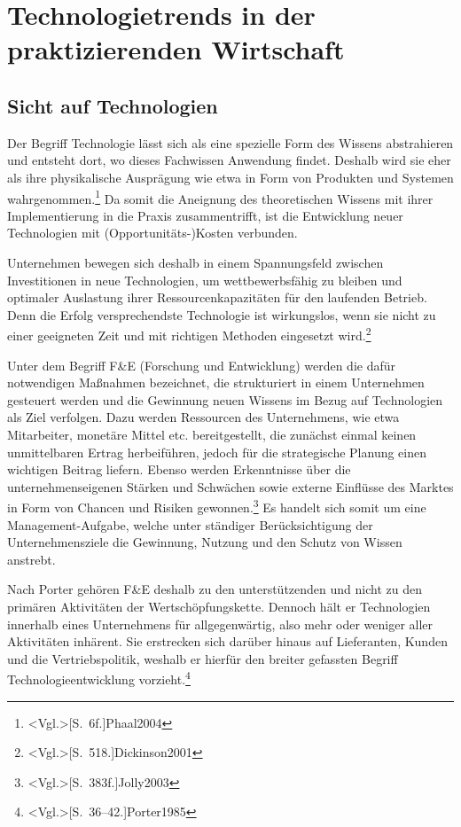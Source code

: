 \section{Technologietrends in der praktizierenden Wirtschaft}

\subsection{Sicht auf Technologien}\label{sec:sight}
Der Begriff Technologie lässt sich als eine spezielle Form des Wissens abstrahieren und entsteht dort, wo dieses Fachwissen Anwendung findet. Deshalb wird sie eher als ihre physikalische Ausprägung wie etwa in Form von Produkten und Systemen wahrgenommen.\footnote{\citeNP<Vgl.>[S.~6f.]{Phaal2004}} Da somit die Aneignung des theoretischen Wissens mit ihrer Implementierung in die Praxis zusammentrifft, ist die Entwicklung neuer Technologien mit (Opportunitäts-)Kosten verbunden.

Unternehmen bewegen sich deshalb in einem Spannungsfeld zwischen Investitionen in neue Technologien, um wettbewerbsfähig zu bleiben und optimaler Auslastung ihrer Ressourcenkapazitäten für den laufenden Betrieb. Denn die Erfolg versprechendste Technologie ist wirkungslos, wenn sie nicht zu einer geeigneten Zeit und mit richtigen Methoden eingesetzt wird.\footnote{\citeNP<Vgl.>[S.~518.]{Dickinson2001}}

Unter dem Begriff F\&E (Forschung und Entwicklung) werden die dafür notwendigen Maßnahmen bezeichnet, die strukturiert in einem Unternehmen gesteuert werden und die Gewinnung neuen Wissens im Bezug auf Technologien als Ziel verfolgen. Dazu werden Ressourcen des Unternehmens, wie etwa Mitarbeiter, monetäre Mittel etc. bereitgestellt, die zunächst einmal keinen unmittelbaren Ertrag herbeiführen, jedoch für die strategische Planung einen wichtigen Beitrag liefern. Ebenso werden Erkenntnisse über die unternehmenseigenen Stärken und Schwächen sowie externe Einflüsse des Marktes in Form von Chancen und Risiken gewonnen.\footnote{\citeNP<Vgl.>[S.~383f.]{Jolly2003}} Es handelt sich somit um eine Management-Aufgabe, welche unter ständiger Berücksichtigung der Unternehmensziele die Gewinnung, Nutzung und den Schutz von Wissen anstrebt.

Nach Porter gehören F\&E deshalb zu den unterstützenden und nicht zu den primären Aktivitäten der Wertschöpfungskette. Dennoch hält er Technologien innerhalb eines Unternehmens für allgegenwärtig, also mehr oder weniger aller Aktivitäten inhärent. Sie erstrecken sich darüber hinaus auf Lieferanten, Kunden und die Vertriebspolitik, weshalb er hierfür den breiter gefassten Begriff Technologieentwicklung vorzieht.\footnote{\citeNP<Vgl.>[S.~36--42.]{Porter1985}}

